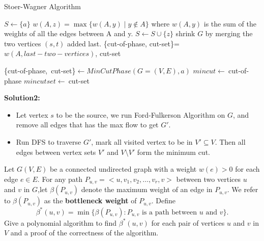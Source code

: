 \documentclass{article}
\newcounter{exercise}
\newcommand{\<}{
    \langle}
\renewcommand{\>}{
    \rangle}
\begin{document}
{\begin{itemize}
    \end{itemize}
\begin{algorithm}[htb]
    \caption{Stoer-Wagner Algorithm}
    \begin{algorithmic}[1]
            \State $S \leftarrow \{a\}$
                \State  $w(A,z)=\max\{w(A,y)\mid y\notin A\}$
                \State where $w(A,y)$ is the sum of the weights of all the edges between A and y.
                \State $S\leftarrow S\cup \{z\}$
                \State shrink $G$ by merging the two vertices $(s, t)$ added last.
                \State
                \Return \{cut-of-phase, cut-set\}=$w(A, last-two-vertices)$, cut-set
            \EndWhile
            
        \EndProcedure
        \leavevmode\newline
                \State \{cut-of-phase,\ cut-set\}$\leftarrow MinCutPhase(G=(V,E),a)$
                    \State $mincut \leftarrow\ $cut-of-phase
                    \State $mincutset \leftarrow\ $cut-set
                \EndIf
            \EndWhile
        \EndProcedure
    \end{algorithmic}
\end{algorithm}

\textbf{Solution2:}
\begin{itemize}
    \item Let vertex $s$ to be the source, we run Ford-Fulkerson Algorithm on $G$, and remove all edges that has the max flow to get $G'$.
    \item Run DFS to traverse $G'$, mark all visited vertex to be in $V' \subseteq V$. Then all edges between vertex sets $V'$ and $V\setminus V'$ form the minimum cut.
\end{itemize}


\begin{exercise}
Let $G(V,E)$ be a connected undirected graph with a weight $w(e)>0$ for each edge $e\in E$. For any path $P_{u,v}=<u,v_1,v_2,\ldots,v_r,v>$ between two vertices $u$ and $v$ in $G$,let $\beta(P_{u,v})$ denote the maximum weight of an edge in $P_{u,v}$. We refer to $\beta(P_{u,v})$ as the \textbf{bottleneck weight} of $P_{u,v}$. Define
\begin{displaymath}
\beta^*(u,v)=\min\{\beta(P_{u,v}):P_{u,v}\text{ is a path between $u$ and $v$}\}.
\end{displaymath}
Give a polynomial algorithm to find $\beta^*(u,v)$ for each pair of vertices $u$ and $v$ in $V$ and a proof of the correctness of the algorithm.
\end{exercise}

}
\end{document}
